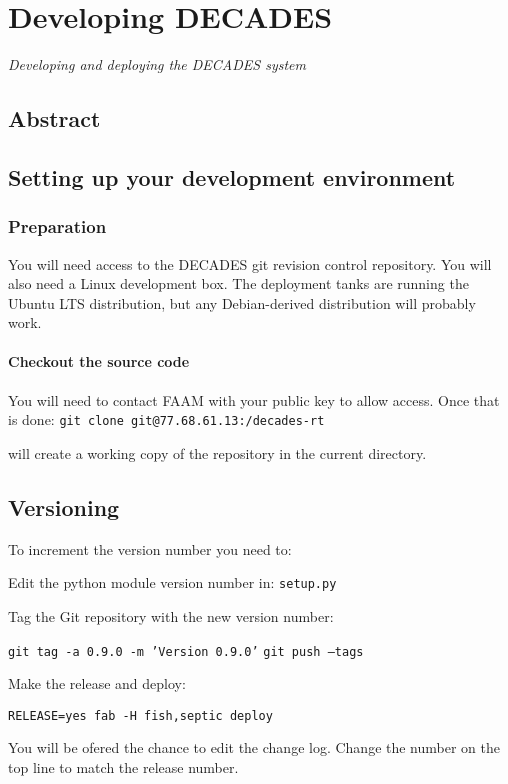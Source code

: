 

\chapter{Developing DECADES}
\begin{center}
{\small\em Developing and deploying the DECADES system}
\end{center}

\section{Abstract}

\section{Setting up your development environment}
\subsection{Preparation}
You will need access to the DECADES git\cite{git} revision control repository. You will also need
a Linux development box. The deployment tanks are running the Ubuntu LTS\cite{ubuntu-lts} 
distribution, but any Debian-derived distribution will probably work.

\subsubsection{Checkout the source code}
You will need to contact FAAM with your public key to allow access. Once that is done:
{\tt git clone git@77.68.61.13:/decades-rt }

will create a working copy of the repository in the current directory.




\section{Versioning}
To increment the version number you need to:

Edit the python module version number in:
{\tt setup.py}

Tag the Git repository with the new version number:

{\tt git tag -a 0.9.0 -m 'Version 0.9.0'}
{\tt git push --tags }

Make the release and deploy:

{\tt RELEASE=yes fab -H fish,septic deploy }

You will be ofered the chance to edit the change log. Change the number on the top line to match the release number.

\newpage
